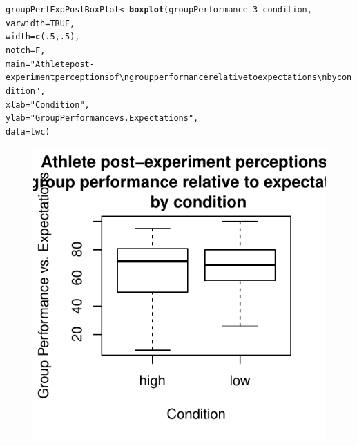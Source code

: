 \documentclass[english]{article}\usepackage[]{graphicx}\usepackage[]{color}
\makeatletter
\def\maxwidth{ %
  \ifdim\Gin@nat@width>\linewidth
    \linewidth
  \else
    \Gin@nat@width
  \fi
}
\newcommand{\hlnum}[1]{\textcolor[rgb]{0.686,0.059,0.569}{#1}}%
\newcommand{\hlstr}[1]{\textcolor[rgb]{0.192,0.494,0.8}{#1}}%
\newcommand{\hlopt}[1]{\textcolor[rgb]{0,0,0}{#1}}%
\newcommand{\hlstd}[1]{\textcolor[rgb]{0.345,0.345,0.345}{#1}}%
\newcommand{\hlkwb}[1]{\textcolor[rgb]{0.69,0.353,0.396}{#1}}%
\newcommand{\hlkwc}[1]{\textcolor[rgb]{0.333,0.667,0.333}{#1}}%
\newcommand{\hlkwd}[1]{\textcolor[rgb]{0.737,0.353,0.396}{\textbf{#1}}}%
\newenvironment{kframe}{%
 \def\at@end@of@kframe{}%
 \ifinner\ifhmode%
  \def\at@end@of@kframe{\end{minipage}}%
  \begin{minipage}{\columnwidth}%
 \fi\fi%
 \def\FrameCommand##1{\hskip\@totalleftmargin \hskip-\fboxsep
 \colorbox{shadecolor}{##1}\hskip-\fboxsep
     \hskip-\linewidth \hskip-\@totalleftmargin \hskip\columnwidth}%
 \MakeFramed {\advance\hsize-\width
   \@totalleftmargin\z@ \linewidth\hsize
   \@setminipage}}%
 {\par\unskip\endMakeFramed%
 \at@end@of@kframe}
\newenvironment{knitrout}{}{} %
\makeatother
\begin{document}
\begin{knitrout}
\color{fgcolor}\begin{kframe}
\begin{alltt}
\hlstd{groupPerfExpPostBoxPlot} \hlkwb{<-} \hlkwd{boxplot}\hlstd{(groupPerformance_3} \hlopt{~} \hlstd{condition,}
                                        \hlkwc{varwidth} \hlstd{=} \hlnum{TRUE}\hlstd{,}
                                        \hlkwc{width} \hlstd{=} \hlkwd{c}\hlstd{(}\hlnum{.5}\hlstd{,}\hlnum{.5}\hlstd{),}
                                        \hlkwc{notch} \hlstd{= F,}
                                        \hlkwc{main} \hlstd{=} \hlstr{"Athlete post-experiment perceptions of \textbackslash{}n group performance relative to expectations \textbackslash{}n by condition"}\hlstd{,}
                                        \hlkwc{xlab} \hlstd{=} \hlstr{"Condition"}\hlstd{,}
                                        \hlkwc{ylab} \hlstd{=} \hlstr{"Group Performance vs. Expectations"}\hlstd{,}
                                        \hlkwc{data} \hlstd{= twc)}
\end{alltt}
\end{kframe}\begin{figure}

{\centering \includegraphics[width=\maxwidth]{figure/groupPerfExpPostBoxPlot-1} 

}

\end{figure}


\end{knitrout}
\end{document}
